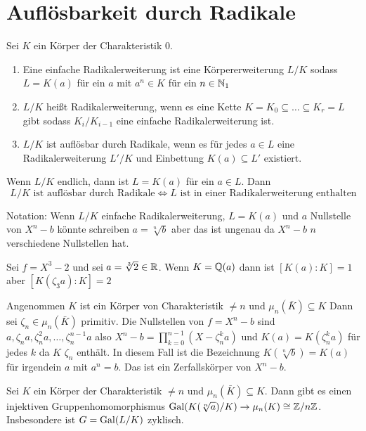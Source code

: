 \section{Auflösbarkeit durch Radikale}
\begin{Def}
	Sei \(K\) ein Körper der Charakteristik 0.
	\begin{enumerate}
		\item Eine einfache Radikalerweiterung ist eine Körpererweiterung \(L/K\) sodass \(L=K(a)\) für ein \(a\) mit \(a^n\in K\) für ein \(n\in\mathbb{N}_1\)
		\item \(L/K\) heißt Radikalerweiterung, wenn es eine Kette \(K=K_0\subseteq\dots \subseteq K_r=L\) gibt sodass \(K_i/K_{i-1}\) eine einfache Radikalerweiterung ist.
		\item \(L/K\) ist auflösbar durch Radikale, wenn es für jedes \(a\in L\) eine Radikalerweiterung \(L'/K\) und Einbettung \(K(a)\subseteq L'\) existiert.
	\end{enumerate}
\end{Def}
\begin{Bem}
	Wenn \(L/K\) endlich, dann ist \(L=K(a)\) für ein \(a\in L\).
	Dann
	\[L/K \text{ ist auflösbar durch Radikale}\iff L\text{ ist in einer Radikalerweiterung enthalten}\]
\end{Bem}
\begin{Bem}
	Notation: Wenn \(L/K\) einfache Radikalerweiterung, \(L=K(a)\) und \(a\) Nullstelle von \(X^n-b\) könnte schreiben \(a=\sqrt[n]{b}\) aber das ist ungenau da \(X^n-b\) \(n\) verschiedene Nullstellen hat.
\end{Bem}
\begin{Bsp}
	Sei \(f=X^3-2\) und sei \(a=\sqrt[3]{2}\in\mathbb{R}\). Wenn \(K=\mathbb{Q}(a)\) dann ist \([K(a):K]=1\) aber \([K(\zeta_3 a):K]=2\)
\end{Bsp}
\begin{Bem}
	Angenommen \(K\) ist ein Körper von Charakteristik \(\neq n\) und \(\mu_n(\bar K)\subseteq K\) Dann sei \(\zeta_n\in\mu_n(\bar K)\) primitiv.
	Die Nullstellen von \(f=X^n-b\) sind \(a,\zeta_na,\zeta_n^2a,\dots,\zeta_n^{n-1}a\) also 
	\(X^n-b=\prod\limits_{k=0}^{n-1}(X-\zeta_n^ka)\) und \(K(a)=K(\zeta_n^ka)\) für jedes \(k\) da \(K\) \(\zeta_n\) enthält. In diesem Fall ist die Bezeichnung \(K(\sqrt[n]{b})=K(a)\) für irgendein \(a\) mit \(a^n=b\). Das ist ein Zerfallskörper von \(X^n-b\).
\end{Bem}
\begin{Lemma}\label{Lem:EinfRadZykl}
	Sei \(K\) ein Körper der Charakteristik \(\neq n\) und \(\mu_n(\bar K)\subseteq K\). Dann gibt es einen injektiven Gruppenhomomorphismus \(\operatorname{Gal}(K(\sqrt[n]{a})/K)\to \mu_n(K)\cong \mathbb{Z}/n\mathbb{Z}\). Insbesondere ist \(G=\operatorname{Gal}(L/K)\) zyklisch.
\end{Lemma}
